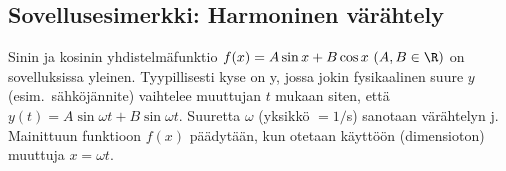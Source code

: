 \subsection*{Sovellusesimerkki: Harmoninen värähtely}

Sinin ja kosinin yhdistelmäfunktio $f(x) = A \sin x + B \cos x\ (A,B\in\R)$ on sovelluksissa 
yleinen. Tyypillisesti kyse on 
%
 y, jossa jokin 
fysikaalinen suure $y$ (esim.\ sähköjännite) vaihtelee muuttujan $t$ mukaan siten, 
että $y(t) = A \sin \omega t + B \sin \omega t$. Suuretta $\omega$  (yksikkö $= 1/$s) sanotaan 
värähtelyn j. Mainittuun funktioon $f(x)$ päädytään, kun otetaan 
käyttöön (dimensioton) muuttuja $x=\omega t$.

